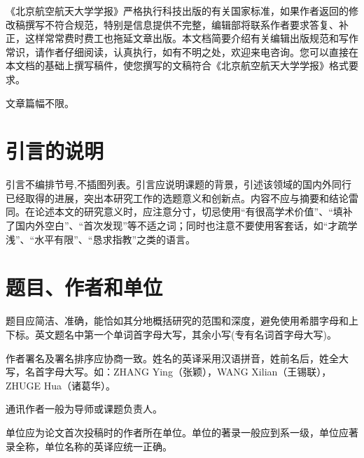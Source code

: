\documentclass[10.5pt,twocolumn]{jbuaa}
\begin{document}
\wuhao


《北京航空航天大学学报》严格执行科技出版的有关国家标准，如果作者返回的修改稿撰写不符合规范，特别是信息提供不完整，编辑部将联系作者要求答复、补正，这样常常费时费工也拖延文章出版。本文档简要介绍有关编辑出版规范和写作常识，请作者仔细阅读，认真执行，如有不明之处，欢迎来电咨询。您可以直接在本文档的基础上撰写稿件，使您撰写的文稿符合《北京航空航天大学学报》格式要求。\enlargethispage{-3.3cm}

文章篇幅不限。

\section{引言的说明}
引言不编排节号,不插图列表。引言应说明课题的背景，引述该领域的国内外同行已经取得的进展，突出本研究工作的选题意义和创新点。内容不应与摘要和结论雷同。在论述本文的研究意义时，应注意分寸，切忌使用“有很高学术价值”、“填补了国内外空白”、“首次发现”等不适之词；同时也注意不要使用客套话，如“才疏学浅”、“水平有限”、“恳求指教”之类的语言。

\section{题目、作者和单位}
\enlargethispage{-3.3cm}
题目应简洁、准确，能恰如其分地概括研究的范围和深度，避免使用希腊字母和上下标。英文题名中第一个单词首字母大写，其余小写(专有名词首字母大写)。

作者署名及署名排序应协商一致。姓名的英译采用汉语拼音，姓前名后，姓全大写，名首字母大写。如：ZHANG Ying（张颖），WANG Xilian（王锡联），ZHUGE Hua（诸葛华）。

通讯作者一般为导师或课题负责人。

单位应为论文首次投稿时的作者所在单位。单位的著录一般应到系一级，单位应著录全称，单位名称的英译应统一正确。
\end{document}
